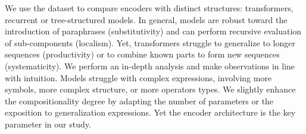 We use the dataset to compare encoders with distinct structures: transformers, recurrent or tree-structured models. In general, models are robust toward the introduction of paraphrases (substitutivity) and can perform recursive evaluation of sub-components (localism). Yet, transformers struggle to generalize to longer sequences (productivity) or to combine known parts to form new sequences (systematicity). We perform an in-depth analysis and make observations in line with intuition. Models struggle with complex expressions, involving more symbols, more complex structure, or more operators types. We slightly enhance the compositionality degree by adapting the number of parameters or the exposition to generalization expressions. Yet the encoder architecture is the key parameter in our study. 

